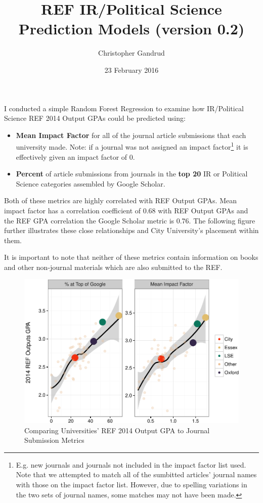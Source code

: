 \documentclass[]{article}
\title{REF IR/Political Science Prediction Models (version 0.2)}
\author{Christopher Gandrud}
\date{23 February 2016}
\let\rmarkdownfootnote\footnote%
\def\footnote{\protect\rmarkdownfootnote}
\begin{document}
\maketitle

I conducted a simple Random Forest Regression to examine how
IR/Political Science REF 2014 Output GPAs could be predicted using:

\begin{itemize}
\item
  \textbf{Mean Impact Factor} for all of the journal article submissions
  that each university made. Note: if a journal was not assigned an
  impact factor\footnote{E.g. new journals and journals not included in
    the impact factor list used. Note that we attempted to match all of
    the sumbitted articles' journal names with those on the impact
    factor list. However, due to spelling variations in the two sets of
    journal names, some matches may not have been made.} it is
  effectively given an impact factor of 0.
\item
  \textbf{Percent} of article submissions from journals in the
  \textbf{top 20} IR or Political Science categories assembled by Google
  Scholar.
\end{itemize}

Both of these metrics are highly correlated with REF Output GPAs. Mean
impact factor has a correlation coefficient of 0.68 with REF Output GPAs
and the REF GPA correlation the Google Scholar metric is 0.76. The
following figure further illustrates these close relationships and City
University's placement within them.

It is important to note that neither of these metrics contain
information on books and other non-journal materials which are also
submitted to the REF.

\begin{figure}[htbp]
\centering
\includegraphics{README_files/figure-latex/descript-1.pdf}
\caption{Comparing Universities' REF 2014 Output GPA to Journal
Submission Metrics}
\end{figure}
\end{document}
